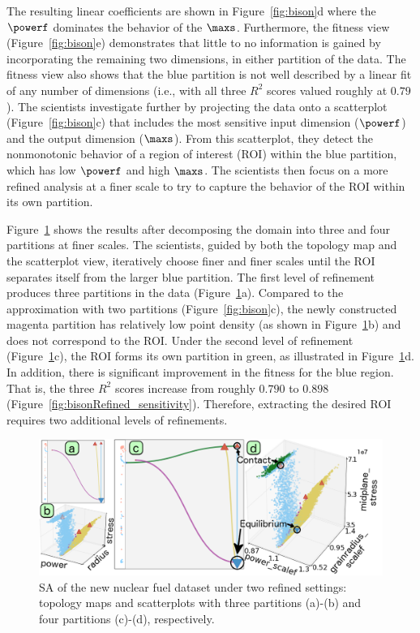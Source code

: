 The resulting linear coefficients are shown in Figure~\ref{fig:bison}d where the $\powerf$ dominates the behavior of the $\maxs$.
%
Furthermore, the fitness view (Figure~\ref{fig:bison}e) demonstrates that little to no information is gained by incorporating the remaining two dimensions, in either partition of the data.
%
The fitness view also shows that the blue partition is not well described by a linear fit of any number of dimensions (i.e., with all three $R^2$ scores valued roughly at $0.79$).
%
The scientists investigate further by projecting the data onto a scatterplot (Figure~\ref{fig:bison}c) that includes the most sensitive input dimension ($\powerf$) and the output dimension ($\maxs$).
%
From this scatterplot, they detect the nonmonotonic behavior of a region of interest (ROI) within the blue partition, which has low $\powerf$ and high $\maxs$.
%
The scientists then focus on a more refined analysis at a finer scale to try to capture the behavior of the ROI within its own partition.

Figure~\ref{fig:bisonRefined} shows the results after decomposing the domain into three and four partitions at finer scales.
%
The scientists, guided by both the topology map and the scatterplot view, iteratively choose finer and finer scales until the ROI separates itself from the larger blue partition.
%
The first level of refinement produces three partitions in the data (Figure~\ref{fig:bisonRefined}a).
%
Compared to the approximation with two partitions (Figure~\ref{fig:bison}c), the newly constructed magenta partition has relatively low point density (as shown in Figure~\ref{fig:bisonRefined}b) and does not correspond to the ROI.
%
Under the second level of refinement (Figure~\ref{fig:bisonRefined}c), the ROI forms its own partition in green, as illustrated in Figure~\ref{fig:bisonRefined}d.
%
In addition, there is significant improvement in the fitness for the blue region.
%
That is, the three $R^2$ scores increase from roughly $0.790$ to $0.898$ (Figure~\ref{fig:bisonRefined_sensitivity}).
%
Therefore, extracting the desired ROI requires two additional levels of refinements.

\begin{figure}[b]
  \centering
  \includegraphics[width=\linewidth]{figs/chap6/bisonRefined3}
  \caption{
  SA of the new nuclear fuel dataset under two refined settings:
  topology maps and scatterplots with three partitions (a)-(b) and four partitions (c)-(d), respectively.}
  \label{fig:bisonRefined}
\end{figure}

